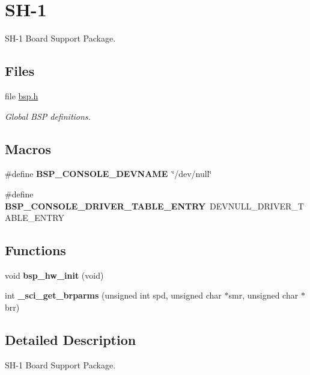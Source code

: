 \hypertarget{group__RTEMSBSPsSH1}{}\section{S\+H-\/1}
\label{group__RTEMSBSPsSH1}


S\+H-\/1 Board Support Package.  


\subsection*{Files}
\begin{DoxyCompactItemize}
\item 
file \mbox{\hyperlink{bsps_2sh_2gensh1_2include_2bsp_8h}{bsp.\+h}}
\begin{DoxyCompactList}\small\item\em Global B\+SP definitions. \end{DoxyCompactList}\end{DoxyCompactItemize}
\subsection*{Macros}
\begin{DoxyCompactItemize}
\item 
\mbox{\label{group__RTEMSBSPsSH1_ga3aad321c9e47ba2afe85c042fc28116a}} 
\#define {\bfseries B\+S\+P\+\_\+\+C\+O\+N\+S\+O\+L\+E\+\_\+\+D\+E\+V\+N\+A\+ME}~\char`\"{}/dev/null\char`\"{}
\item 
\mbox{\label{group__RTEMSBSPsSH1_ga7a07e7d7ae2a04a1fa54b48d261a82bf}} 
\#define {\bfseries B\+S\+P\+\_\+\+C\+O\+N\+S\+O\+L\+E\+\_\+\+D\+R\+I\+V\+E\+R\+\_\+\+T\+A\+B\+L\+E\+\_\+\+E\+N\+T\+RY}~D\+E\+V\+N\+U\+L\+L\+\_\+\+D\+R\+I\+V\+E\+R\+\_\+\+T\+A\+B\+L\+E\+\_\+\+E\+N\+T\+RY
\end{DoxyCompactItemize}
\subsection*{Functions}
\begin{DoxyCompactItemize}
\item 
\mbox{\label{group__RTEMSBSPsSH1_gad645179cbf4b50dedeb57bc691cb548f}} 
void {\bfseries bsp\+\_\+hw\+\_\+init} (void)
\item 
\mbox{\label{group__RTEMSBSPsSH1_ga77a90b9ec1a77714a18ec6bab9188c6c}} 
int {\bfseries \+\_\+sci\+\_\+get\+\_\+brparms} (unsigned int spd, unsigned char $\ast$smr, unsigned char $\ast$brr)
\end{DoxyCompactItemize}


\subsection{Detailed Description}
S\+H-\/1 Board Support Package. 

